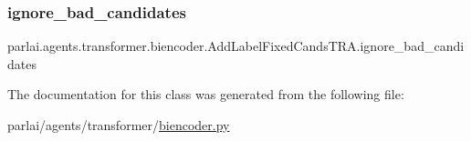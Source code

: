 \subsubsection{\texorpdfstring{ignore\+\_\+bad\+\_\+candidates}{ignore\_bad\_candidates}}
{\footnotesize\ttfamily parlai.\+agents.\+transformer.\+biencoder.\+Add\+Label\+Fixed\+Cands\+T\+R\+A.\+ignore\+\_\+bad\+\_\+candidates}



The documentation for this class was generated from the following file\+:\begin{DoxyCompactItemize}
\item 
parlai/agents/transformer/\hyperlink{biencoder_8py}{biencoder.\+py}\end{DoxyCompactItemize}
